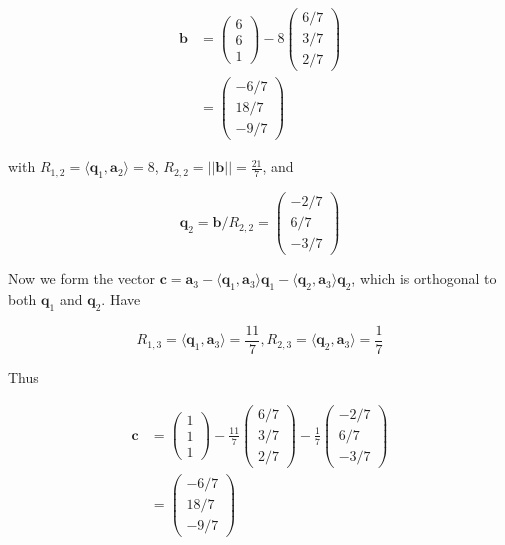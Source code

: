 \documentclass[a4paper]{article}
\begin{document}
\begin{align*}
\mathbf{b} & = \begin{pmatrix}
6\\
6\\
1
\end{pmatrix} - 8 \begin{pmatrix}
6/7\\
3/7\\
2/7
\end{pmatrix} \\
& = \begin{pmatrix}
- 6/7 \\
18/7\\
-9/7
\end{pmatrix}
\end{align*}

with $ R_{1,2} = \langle \mathbf{q}_{1},\mathbf{a}_{2} \rangle = 8$, $ R_{2,2} = | | \mathbf{b} | | = \frac{21}{7} $, and 

\[ \mathbf{q}_{2} = \mathbf{b} / R_{2,2} = \begin{pmatrix}
-2/7\\
6/7\\
-3/7
\end{pmatrix}  \] 

Now we form the vector $ \mathbf{c} = \mathbf{a}_{3} - \langle \mathbf{q}_{1},\mathbf{a}_{3} \rangle \mathbf{q}_{1} - \langle \mathbf{q}_{2},\mathbf{a}_{3} \rangle \mathbf{q}_{2}  $, which is orthogonal to both $ \mathbf{q}_{1} $ and $ \mathbf{q}_{2} $. Have

\[ R_{1,3} = \langle \mathbf{q}_{1},\mathbf{a}_{3} \rangle = \frac{11}{7}, R_{2,3} = \langle \mathbf{q}_{2},\mathbf{a}_{3} \rangle = \frac{1}{7} \] 

Thus

\begin{align*}
\mathbf{c} & = \begin{pmatrix}
1\\
1\\
1
\end{pmatrix} - \frac{11}{7} \begin{pmatrix}
6/7\\
3/7\\
2/7
\end{pmatrix} - \frac{1}{7} \begin{pmatrix}
-2/7\\
6/7\\
-3/7
\end{pmatrix} \\
& = \begin{pmatrix}
- 6/7 \\
18/7\\
-9/7
\end{pmatrix}
\end{align*}
\end{document}
